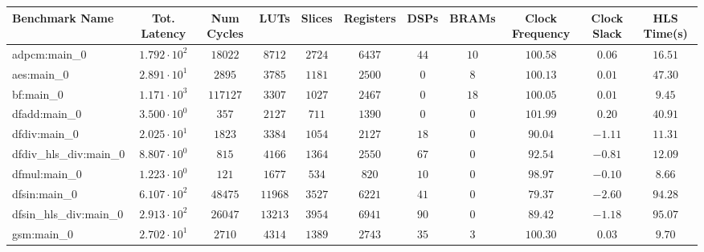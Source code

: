 \begin{tabular}{|l|c|c|c|c|c|c|c|c|c|c|}
\hline
Benchmark Name          & Tot. Latency           & Num Cycles & LUTs      & Slices    & Registers & DSPs    & BRAMs   & Clock Frequency & Clock Slack & HLS Time(s) \\
\hline
adpcm:main\_0           & $ 1.792 \cdot 10^{2} $ & $ 18022  $ & $ 8712  $ & $ 2724  $ & $ 6437  $ & $ 44  $ & $ 10  $ & $ 100.58      $ & $ 0.06    $ & $ 16.51   $ \\
aes:main\_0             & $ 2.891 \cdot 10^{1} $ & $ 2895   $ & $ 3785  $ & $ 1181  $ & $ 2500  $ & $ 0   $ & $ 8   $ & $ 100.13      $ & $ 0.01    $ & $ 47.30   $ \\
bf:main\_0              & $ 1.171 \cdot 10^{3} $ & $ 117127 $ & $ 3307  $ & $ 1027  $ & $ 2467  $ & $ 0   $ & $ 18  $ & $ 100.05      $ & $ 0.01    $ & $ 9.45    $ \\
dfadd:main\_0           & $ 3.500 \cdot 10^{0} $ & $ 357    $ & $ 2127  $ & $ 711   $ & $ 1390  $ & $ 0   $ & $ 0   $ & $ 101.99      $ & $ 0.20    $ & $ 40.91   $ \\
dfdiv:main\_0           & $ 2.025 \cdot 10^{1} $ & $ 1823   $ & $ 3384  $ & $ 1054  $ & $ 2127  $ & $ 18  $ & $ 0   $ & $ 90.04       $ & $ -1.11   $ & $ 11.31   $ \\
dfdiv\_hls\_div:main\_0 & $ 8.807 \cdot 10^{0} $ & $ 815    $ & $ 4166  $ & $ 1364  $ & $ 2550  $ & $ 67  $ & $ 0   $ & $ 92.54       $ & $ -0.81   $ & $ 12.09   $ \\
dfmul:main\_0           & $ 1.223 \cdot 10^{0} $ & $ 121    $ & $ 1677  $ & $ 534   $ & $ 820   $ & $ 10  $ & $ 0   $ & $ 98.97       $ & $ -0.10   $ & $ 8.66    $ \\
dfsin:main\_0           & $ 6.107 \cdot 10^{2} $ & $ 48475  $ & $ 11968 $ & $ 3527  $ & $ 6221  $ & $ 41  $ & $ 0   $ & $ 79.37       $ & $ -2.60   $ & $ 94.28   $ \\
dfsin\_hls\_div:main\_0 & $ 2.913 \cdot 10^{2} $ & $ 26047  $ & $ 13213 $ & $ 3954  $ & $ 6941  $ & $ 90  $ & $ 0   $ & $ 89.42       $ & $ -1.18   $ & $ 95.07   $ \\
gsm:main\_0             & $ 2.702 \cdot 10^{1} $ & $ 2710   $ & $ 4314  $ & $ 1389  $ & $ 2743  $ & $ 35  $ & $ 3   $ & $ 100.30      $ & $ 0.03    $ & $ 9.70    $ \\

\end{tabular}

